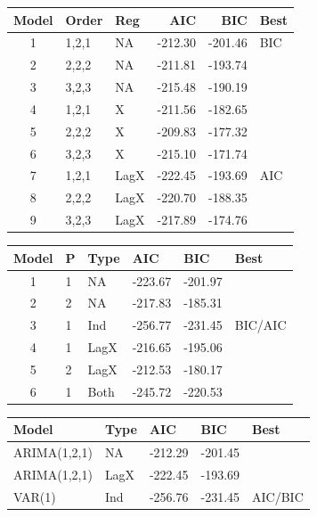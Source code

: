 \documentclass[twoside,twocolumn]{article}
\begin{document}
\begin{table}[ht]
\centering
\begin{tabular}{cllrrl}
  \hline
 Model & Order & Reg  & AIC & BIC & Best \\ 
  \hline
1 & 1,2,1 &  NA &   -212.30 & -201.46 & BIC \\ 
  2  & 2,2,2 & NA   & -211.81 & -193.74 &  \\ 
  3  & 3,2,3 &  NA  & -215.48 & -190.19 &  \\ 
  4  & 1,2,1 & X  & -211.56 & -182.65 &  \\ 
  5  & 2,2,2 & X   & -209.83 & -177.32 &  \\ 
  6  & 3,2,3 & X   & -215.10 & -171.74 &  \\ 
  7  & 1,2,1 &  LagX & -222.45 & -193.69 & AIC \\ 
  8  & 2,2,2 &  LagX & -220.70 & -188.35 &  \\ 
  9  & 3,2,3 &  LagX & -217.89 & -174.76 &  \\ 
   \hline
\end{tabular}
\end{table}

\begin{table}[ht]
\centering
\begin{tabular}{clllll}
  \hline
 Model & P & Type &  AIC & BIC & Best \\ 
  \hline
1  & 1 & NA  &  -223.67 & -201.97 &  \\ 
  2  & 2 & NA  &   -217.83 & -185.31 &  \\ 
  3  & 1 & Ind  & -256.77 & -231.45 & BIC/AIC \\ 
  4  & 1 & LagX & -216.65 & -195.06 &  \\ 
  5  & 2 & LagX & -212.53 & -180.17 &  \\ 
  6  & 1 & Both  & -245.72 & -220.53 &  \\ 
   \hline
\end{tabular}
\end{table}

\begin{table}[ht]
\centering
\begin{tabular}{lllll}
  \hline
Model & Type & AIC & BIC & Best \\ 
  \hline
ARIMA(1,2,1) & NA &   -212.29 & -201.45 &  \\ 
ARIMA(1,2,1) & LagX   & -222.45 & -193.69 &  \\ 
VAR(1) & Ind & -256.76 & -231.45 & AIC/BIC \\ 
   \hline
\end{tabular}
\end{table}
\end{document}
